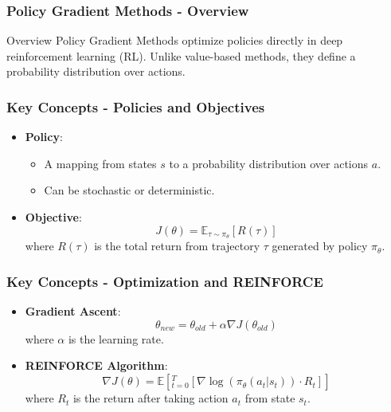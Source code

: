 \documentclass[aspectratio=169]{beamer}
\begin{document}
\begin{frame}[fragile]
    \frametitle{Policy Gradient Methods - Overview}
    \begin{block}{Overview}
        Policy Gradient Methods optimize policies directly in deep reinforcement learning (RL). 
        Unlike value-based methods, they define a probability distribution over actions.
    \end{block}
\end{frame}

\begin{frame}[fragile]
    \frametitle{Key Concepts - Policies and Objectives}
    \begin{itemize}
        \item \textbf{Policy}:
            \begin{itemize}
                \item A mapping from states $s$ to a probability distribution over actions $a$.
                \item Can be stochastic or deterministic.
            \end{itemize}
        \item \textbf{Objective}:
            \begin{equation}
                J(θ) = \mathbb{E}_{τ \sim π_θ} [R(τ)]
            \end{equation}
            where $R(τ)$ is the total return from trajectory $τ$ generated by policy $π_θ$.
    \end{itemize}
\end{frame}

\begin{frame}[fragile]
    \frametitle{Key Concepts - Optimization and REINFORCE}
    \begin{itemize}
        \item \textbf{Gradient Ascent}:
            \begin{equation}
                θ_{new} = θ_{old} + α \nabla J(θ_{old})
            \end{equation}
            where $α$ is the learning rate.
        \item \textbf{REINFORCE Algorithm}:
            \begin{equation}
                \nabla J(θ) = \mathbb{E}[_{t=0}^{T} [\nabla \log(π_θ(a_t|s_t)) \cdot R_t]]
            \end{equation}
            where $R_t$ is the return after taking action $a_t$ from state $s_t$.
    \end{itemize}
\end{frame}
\end{document}
